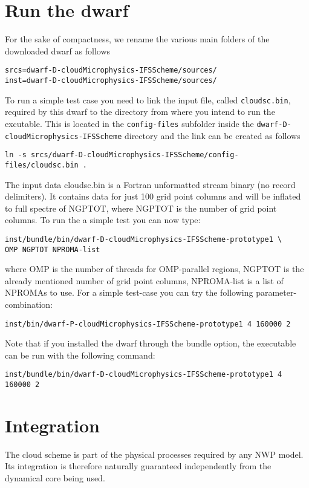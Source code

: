 \documentclass[
a4paper,     %
12pt,        %
article,
onecolumn,   %
openany,     %
]{memoir}
\newcommand{\inlsh}[1]{\texttt{#1}}
\newcommand{\inlsh}[1]{\tikz[anchor=base,baseline]\node[inner sep=2pt,
outer sep=0,draw=yellow!10,fill=yellow!10]{\texttt{#1}};}
\begin{document}
\section{Run the dwarf}
For the sake of compactness, we rename the various main 
folders of the downloaded dwarf as follows 
%
\begin{lstlisting}[style=BashStyle]
srcs=dwarf-D-cloudMicrophysics-IFSScheme/sources/
inst=dwarf-D-cloudMicrophysics-IFSScheme/sources/
\end{lstlisting}
%
To run a simple test case you need to link the input file, 
called \inlsh{cloudsc.bin}, required by this dwarf to the 
directory from where you intend to run the excutable.
This is located in the \inlsh{config-files} subfolder inside 
the \inlsh{dwarf-D-cloudMicrophysics-IFSScheme} directory 
and the link can be created as follows
%
\begin{lstlisting}[style=BashStyle]
ln -s srcs/dwarf-D-cloudMicrophysics-IFSScheme/config-files/cloudsc.bin .
\end{lstlisting}
%
The input data cloudsc.bin is a Fortran unformatted stream binary 
(no record delimiters). It contains data for just 100 grid point 
columns and will be inflated to full spectre of NGPTOT, where 
NGPTOT is the number of grid point columns. To run the a simple 
test you can now type:
%
\begin{lstlisting}[style=BashStyle]
inst/bundle/bin/dwarf-D-cloudMicrophysics-IFSScheme-prototype1 \
OMP NGPTOT NPROMA-list
\end{lstlisting}
%
where OMP is the number of threads for OMP-parallel regions, 
NGPTOT is the already mentioned number of grid point columns, 
NPROMA-list is a list of NPROMAs to use. For a simple test-case 
you can try the following parameter-combination:
%
\begin{lstlisting}[style=BashStyle]
inst/bin/dwarf-P-cloudMicrophysics-IFSScheme-prototype1 4 160000 2
\end{lstlisting}
%
Note that if you installed the dwarf through the bundle option, 
the executable can be run with the following command:
%
\begin{lstlisting}[style=BashStyle]
inst/bundle/bin/dwarf-D-cloudMicrophysics-IFSScheme-prototype1 4 160000 2
\end{lstlisting}
%

 


\section{Integration}
The cloud scheme is part of the physical processes required 
by any NWP model. Its integration is therefore naturally 
guaranteed independently from the dynamical core being 
used.


\backmatter




\end{document}
